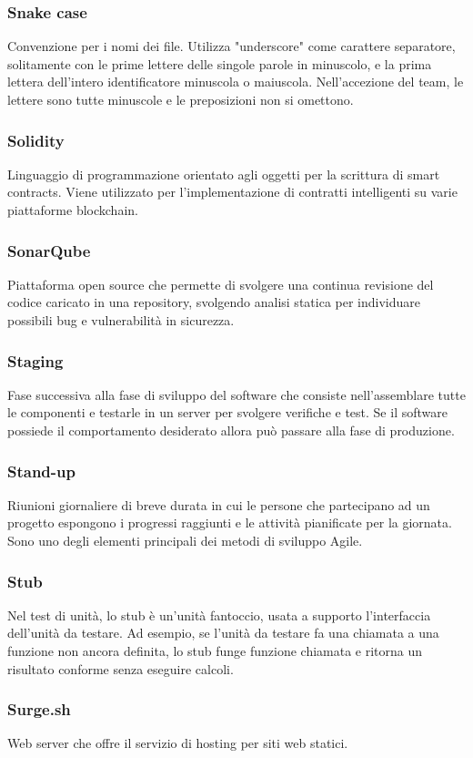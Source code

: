 \subsubsection*{Snake case}
Convenzione per i nomi dei file. Utilizza "underscore" come carattere separatore, solitamente con le prime lettere delle singole parole in minuscolo, e la prima lettera dell'intero identificatore minuscola o maiuscola.
Nell'accezione del team, le lettere sono tutte minuscole e le preposizioni non si omettono.

\subsubsection*{Solidity}
Linguaggio di programmazione orientato agli oggetti per la scrittura di smart contracts\glosp. Viene utilizzato per l'implementazione di contratti intelligenti su varie piattaforme blockchain\glo.

\subsubsection*{SonarQube}
Piattaforma open source che permette di svolgere una continua revisione del codice caricato in una repository, svolgendo analisi statica per individuare possibili bug e vulnerabilità in sicurezza.

\subsubsection*{Staging}
Fase successiva alla fase di sviluppo del software che consiste nell'assemblare tutte le componenti e testarle in un server per svolgere verifiche e test. Se il software possiede il comportamento desiderato allora può passare alla fase di produzione.

\subsubsection*{Stand-up}
Riunioni giornaliere di breve durata in cui le persone che partecipano ad un progetto espongono i progressi raggiunti e le attività pianificate per la giornata. Sono uno degli elementi principali dei metodi di sviluppo Agile\glo. 

\subsubsection*{Stub}
Nel test di unità, lo stub è un'unità fantoccio, usata a supporto l'interfaccia dell'unità da testare. Ad esempio, se l'unità da testare fa una chiamata a una funzione non ancora definita, lo stub funge funzione chiamata e ritorna un risultato conforme senza eseguire calcoli.

\subsubsection*{Surge.sh}
Web server che offre il servizio di hosting per siti web statici.

